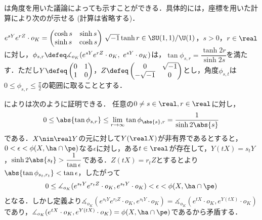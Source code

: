 \begin{rem}\label{rem:su11-by-angle}

  は角度を用いた議論によっても示すことができる．具体的には，座標を用いた計算により次のが示せる (計算は省略する)．
  \begin{lem}\label{lem:0106}
    $e^{sY}e^{rZ}\cdot o_K =
    \begin{pmatrix}
      \cosh s & \sinh s\\ \sinh s & \cosh s
    \end{pmatrix}\,
    \sqrt{-1}\tanh r \in \SU(1,1)/\U(1) $，$s > 0$，$r\in \real$に対し，$\phi_{s,r}\defeq \measuredangle_{o_K}(e^{sY}e^{rZ}\cdot o_K,\ e^{sY}\cdot o_K) $は，$\tan \phi_{s,r} = \dfrac{\tanh 2r}{\sinh 2s} $を満たす．ただし$Y \defeq
  \begin{pmatrix}
    0 & 1\\ 1 & 0
  \end{pmatrix}
  $，$Z \defeq \begin{pmatrix}
    0 & \sqrt{-1} \\ -\sqrt{-1} & 0
  \end{pmatrix}$とし，角度$\phi_{s,t} $は$0\leq \phi_{s,r}\leq \frac{\pi}{2} $の範囲に取ることとする．
  \end{lem}  

  によりは次のように証明できる．
  任意の$0\neq s\in \real, r\in \real $に対し，
  \begin{align}
    0 \leq \abs{\tan \phi_{s,r}} \leq  \lim_{r\to \infty}\tan \phi_{\abs{s},r} = \dfrac{1}{\sinh 2\abs{s}}\label{eq:0106}
  \end{align}
  である．$X\nin \real Y $の元に対して$Y(\real X) $が非有界であるとすると，$ 0 <  \epsilon < \phi(X,\ha\cap\pe)$なる$\epsilon$に対し，ある$t\in \real $が存在して，$Y(tX) = s_tY $，$\sinh 2\abs{s_t} > \dfrac{1}{\tan \epsilon} $である．$Z(tX) = r_tZ $とするとより$\abs{\tan \phi_{s_t,r_t}} < \tan \epsilon $，したがって
  \begin{align*}
    0\leq \measuredangle_{o_K}(e^{s_tY}e^{r_t Z}\cdot o_K, e^{s_tY}\cdot o_K) < \epsilon < \phi(X,\ha\cap\pe)
  \end{align*}
  となる．しかし定義より$\measuredangle_{o_K}(e^{s_tY}e^{r_t Z}\cdot o_K, e^{s_tY}\cdot o_K) = \measuredangle_{o_K}(e^{tX}\cdot o_K, e^{Y(tX) }\cdot o_K) $であり，$\measuredangle_{o_K}(e^{tX}\cdot o_K, e^{Y(tX) }\cdot o_K) = \phi(X,\ha\cap\pe)$であるから矛盾する． 

  
\end{rem}

